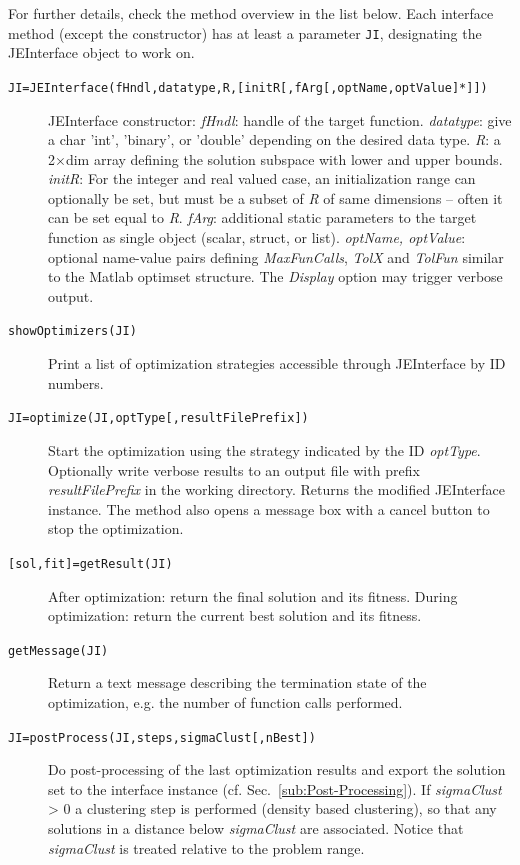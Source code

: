 For further details, check the method overview in the list below.
Each interface method (except the constructor) has at least a parameter
\texttt{JI}, designating the JEInterface object to work on.
\begin{description}
\item [{\texttt{JI=JEInterface(fHndl,datatype,R,{[}initR{[},fArg{[},optName,optValue{]}{*}{]}{]})}}] JEInterface
constructor: \emph{fHndl}: handle of the target function. \emph{datatype}:
give a char 'int', 'binary', or 'double' depending on the desired
data type. \emph{R}: a 2$\times$dim array defining the solution subspace
with lower and upper bounds. \emph{initR}: For the integer and real
valued case, an initialization range can optionally be set, but must
be a subset of \emph{R} of same dimensions -- often it can be set
equal to \emph{R}. \emph{fArg}: additional static parameters to the
target function as single object (scalar, struct, or list). \emph{optName,
optValue}: optional name-value pairs defining \emph{MaxFunCalls},
\emph{TolX} and \emph{TolFun} similar to the Matlab optimset structure.
The \emph{Display} option may trigger verbose output. 
\item [{\texttt{showOptimizers(JI)}}] Print a list of optimization strategies
accessible through JEInterface by ID numbers.
\item [{\texttt{JI=optimize(JI,optType{[},resultFilePrefix{]})}}] Start
the optimization using the strategy indicated by the ID \emph{optType}.
Optionally write verbose results to an output file with prefix \emph{resultFilePrefix}
in the working directory. Returns the modified JEInterface instance.
The method also opens a message box with a cancel button to stop the
optimization.
\item [{\texttt{{[}sol,fit{]}=getResult(JI)}}] After optimization: return
the final solution and its fitness. During optimization: return the
current best solution and its fitness.
\item [{\texttt{getMessage(JI)}}] Return a text message describing the
termination state of the optimization, e.g. the number of function
calls performed.
\item [{\texttt{JI=postProcess(JI,steps,sigmaClust{[},nBest{]})}}] Do post-processing
of the last optimization results and export the solution set to the
interface instance (cf. Sec.~\ref{sub:Post-Processing}). If \emph{sigmaClust}
> 0 a clustering step is performed (density based clustering), so
that any solutions in a distance below \emph{sigmaClust} are associated.
Notice that \emph{sigmaClust} is treated relative to the problem range.

\end{description}
